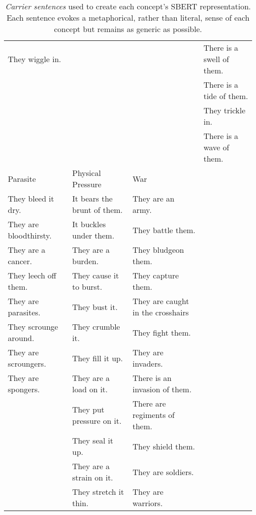 \begin{table*}[htbp!]
{\begin{tabular}{@{}llll@{}}
They wiggle in. &  &  & There is a swell of them. \\
 &  &  & There is a tide of them. \\
 &  &  & They trickle in. \\
 &  &  & There is a wave of them. \\ \midrule
Parasite & Physical Pressure & War &  \\ \midrule
They bleed it dry. & It bears the brunt of them. & They are an army. &  \\
They are bloodthirsty. & It buckles under them. & They battle them. &  \\
They are a cancer. & They are a burden. & They bludgeon them. &  \\
They leech off them. & They cause it to burst. & They capture them. &  \\
They are parasites. & They bust it. & They are caught in the crosshairs &  \\
They scrounge around. & They crumble it. & They fight them. &  \\
They are scroungers. & They fill it up. & They are invaders. &  \\
They are spongers. & They are a load on it. & There is an invasion of them. &  \\
 & They put pressure on it. & There are regiments of them. &  \\
 & They seal it up. & They shield them. &  \\
 & They are a strain on it. & They are soldiers. &  \\
 & They stretch it thin. & They are warriors. &  \\ \bottomrule
\end{tabular}%
}
\caption{\textit{Carrier sentences} used to create each concept's SBERT representation. Each sentence evokes a metaphorical, rather than literal, sense of each concept but remains as generic as possible.}
\label{tab:sentences}
\end{table*}


